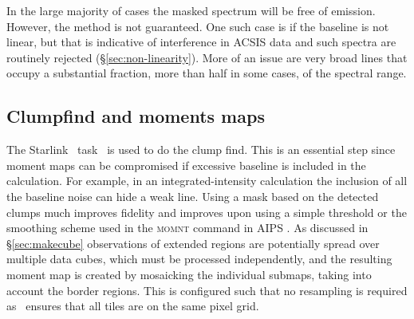 \documentclass[final,authoryear,5p,times,twocolumn]{elsarticle}
\begin{document}
In the large majority of cases the masked spectrum will be free of
emission.  However, the method is not guaranteed.  One such case is if
the baseline is not linear, but that is indicative of interference in
ACSIS data and such spectra are routinely rejected
(\mbox{\S \ref{sec:non-linearity}}).  More of an issue are very broad
lines that occupy a substantial fraction, more than half in some
cases, of the spectral range.

\subsection{Clumpfind and moments maps \label{sec:moment}}

The Starlink \cupid\ task \findclumps\ is used to do the clump
find. This is an essential step since moment maps can be compromised
if excessive baseline is included in the calculation. For example, in an
integrated-intensity calculation the inclusion of all the baseline noise can
hide a weak line.
Using a mask based on the detected clumps much improves
fidelity and improves upon using a simple threshold or
the smoothing scheme used in the \textsc{momnt} command in AIPS
\cite[][]{2003ASSL..285..109G}. As discussed in \S \ref{sec:makecube}
observations of extended regions are potentially spread over multiple
data cubes, which must be processed independently, and the resulting
moment map is created by
mosaicking the individual submaps, taking into account the border
regions. This is configured such that no resampling is required as
\makecube\ ensures that all tiles are on the same pixel grid.
\end{document}
